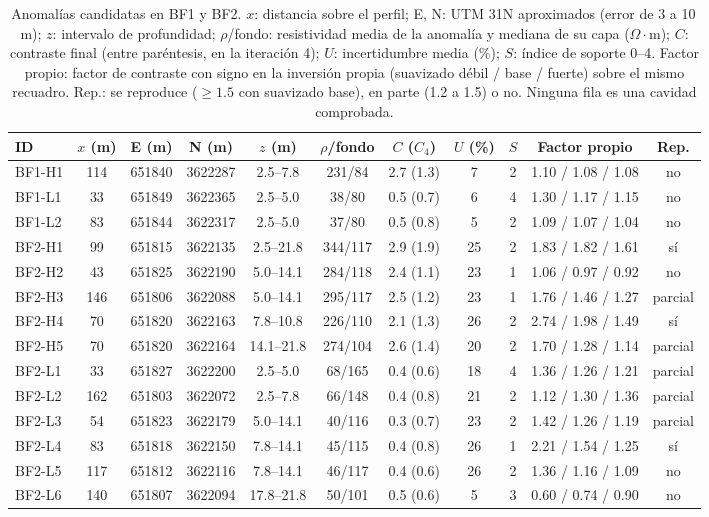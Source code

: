 \documentclass[conference]{IEEEtran}
\newcommand{\ohmm}{\ensuremath{\Omega\!\cdot\!\mathrm{m}}}
\begin{document}
\begin{table}[!t]
\caption{Anomal\'ias candidatas en BF1 y BF2. $x$: distancia sobre el perfil; E, N: UTM 31N aproximados (error de 3 a 10\,m); $z$: intervalo de profundidad; $\rho$/fondo: resistividad media de la anomal\'ia y mediana de su capa (\ohmm); $C$: contraste final (entre par\'entesis, en la iteraci\'on 4); $U$: incertidumbre media (\%); $S$: \'indice de soporte 0--4. Factor propio: factor de contraste con signo en la inversi\'on propia (suavizado d\'ebil / base / fuerte) sobre el mismo recuadro. Rep.: se reproduce ($\ge1.5$ con suavizado base), en parte (1.2 a 1.5) o no. Ninguna fila es una cavidad comprobada.}
\label{tab:cand}
\centering\footnotesize
\setlength{\tabcolsep}{4.5pt}
\begin{tabular}{lcccccccccc}
\toprule
ID & $x$ (m) & E (m) & N (m) & $z$ (m) & $\rho$/fondo & $C$ ($C_{4}$) & $U$ (\%) & $S$ & Factor propio & Rep. \\
\midrule
BF1-H1 & 114 & 651840 & 3622287 & 2.5--7.8 & 231/84 & 2.7 (1.3) & 7 & 2 & 1.10 / 1.08 / 1.08 & no \\
BF1-L1 & 33 & 651849 & 3622365 & 2.5--5.0 & 38/80 & 0.5 (0.7) & 6 & 4 & 1.30 / 1.17 / 1.15 & no \\
BF1-L2 & 83 & 651844 & 3622317 & 2.5--5.0 & 37/80 & 0.5 (0.8) & 5 & 2 & 1.09 / 1.07 / 1.04 & no \\
BF2-H1 & 99 & 651815 & 3622135 & 2.5--21.8 & 344/117 & 2.9 (1.9) & 25 & 2 & 1.83 / 1.82 / 1.61 & sí \\
BF2-H2 & 43 & 651825 & 3622190 & 5.0--14.1 & 284/118 & 2.4 (1.1) & 23 & 1 & 1.06 / 0.97 / 0.92 & no \\
BF2-H3 & 146 & 651806 & 3622088 & 5.0--14.1 & 295/117 & 2.5 (1.2) & 23 & 1 & 1.76 / 1.46 / 1.27 & parcial \\
BF2-H4 & 70 & 651820 & 3622163 & 7.8--10.8 & 226/110 & 2.1 (1.3) & 26 & 2 & 2.74 / 1.98 / 1.49 & sí \\
BF2-H5 & 70 & 651820 & 3622164 & 14.1--21.8 & 274/104 & 2.6 (1.4) & 20 & 2 & 1.70 / 1.28 / 1.14 & parcial \\
BF2-L1 & 33 & 651827 & 3622200 & 2.5--5.0 & 68/165 & 0.4 (0.6) & 18 & 4 & 1.36 / 1.26 / 1.21 & parcial \\
BF2-L2 & 162 & 651803 & 3622072 & 2.5--7.8 & 66/148 & 0.4 (0.8) & 21 & 2 & 1.12 / 1.30 / 1.36 & parcial \\
BF2-L3 & 54 & 651823 & 3622179 & 5.0--14.1 & 40/116 & 0.3 (0.7) & 23 & 2 & 1.42 / 1.26 / 1.19 & parcial \\
BF2-L4 & 83 & 651818 & 3622150 & 7.8--14.1 & 45/115 & 0.4 (0.8) & 26 & 1 & 2.21 / 1.54 / 1.25 & sí \\
BF2-L5 & 117 & 651812 & 3622116 & 7.8--14.1 & 46/117 & 0.4 (0.6) & 26 & 2 & 1.36 / 1.16 / 1.09 & no \\
BF2-L6 & 140 & 651807 & 3622094 & 17.8--21.8 & 50/101 & 0.5 (0.6) & 5 & 3 & 0.60 / 0.74 / 0.90 & no \\
\bottomrule
\end{tabular}
\end{table}
\end{document}
